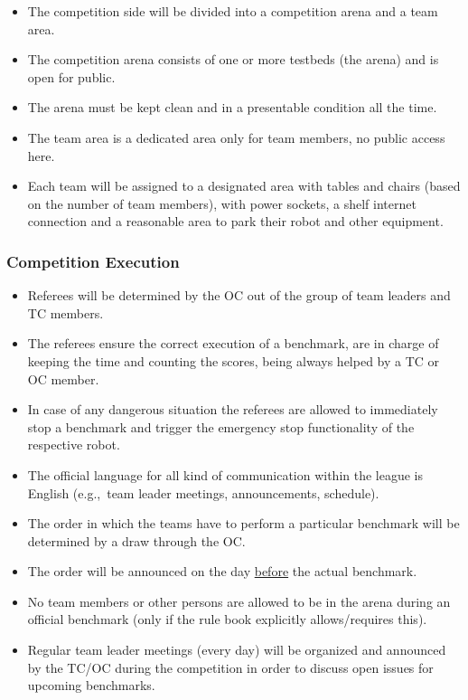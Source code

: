 \begin{description}
\begin{itemize}
	  	\item The competition side will be divided into a competition arena and a team area.
	  	\item The competition arena consists of one or more testbeds (the arena) and is open for public.
	  	\item The arena must be kept clean and in a presentable condition all the time.
	  	\item The team area is a dedicated area only for team members, no public access here.
	  	\item Each team will be assigned to a designated area with tables and chairs (based on the number of team members), with power sockets, a shelf internet connection and a reasonable area to park their robot and other equipment.
	\end{itemize}  
\end{description}

\subsubsection{Competition Execution}
\label{sssec:CompExec}

\begin{itemize}
\item Referees will be determined by the OC out of the group of team leaders and TC members.
\item The referees ensure the correct execution of a benchmark, are in charge of keeping the time and counting the scores, being always helped by a TC or OC member.
\item In case of any dangerous situation the referees are allowed to immediately stop a benchmark and trigger the emergency stop functionality of the respective robot.
\item The official language for all kind of communication within the league is English (e.g.,~team leader meetings, announcements, schedule).
\item The order in which the teams have to perform a particular benchmark will be determined by a draw through the OC.
\item The order will be announced on the day \underline{before} the actual benchmark.
\item No team members or other persons are allowed to be in the arena during an official benchmark (only if the rule book explicitly allows/requires this).
\item Regular team leader meetings (every day) will be organized and announced by the TC/OC during the competition in order to discuss open issues for upcoming benchmarks.
\end{itemize}

